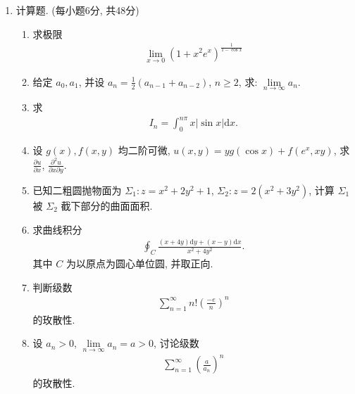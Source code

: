 \documentclass[space]{ctexart} %
\def\geq{\geqslant}
\begin{document}
\vspace*{0.5cm}
\begin{enumerate}[itemsep=1.2em,label=\arabic*.,topsep=0pt,left=0em]
\item 计算题. (每小题6分, 共48分)

\setcounter{enumii}{0}
\begin{enumerate}[itemsep=1.2em,label=(\arabic*),topsep=0pt,left=2em] %

\item  求极限
\begin{align*}
\lim\limits_{x \rightarrow 0}\left(1+x^{2} e^{x}\right)^{\frac{1}{1-\cos x}}
\end{align*}


\item   给定  $a_{0}, a_{1} $, 并设 $ a_{n}=\frac{1}{2}\left(a_{n-1}+a_{n-2}\right)$, $n \geq 2 $, 求:  $\lim\limits_{n \rightarrow \infty} a_{n} $.

\item 求
\begin{align*}
I_{n}=\int_{0}^{n \pi} x|\sin x| \mathrm{d} x.
\end{align*}

\item  设  $g(x), f(x, y)$  均二阶可微, $ u(x, y)=y g(\cos x)+f\left(e^{x}, x y\right) $, 求 $ \frac{\partial u}{\partial x}$, $\frac{\partial^{2} u}{\partial x \partial y} $.

\item 已知二粗圆抛物面为 $ \Sigma_{1}: z=x^{2}+2 y^{2}+1$, $\Sigma_{2}: z=2\left(x^{2}+3 y^{2}\right) $, 计算 $ \Sigma_{1} $ 被  $\Sigma_{2} $ 截下部分的曲面面积.

\item  求曲线积分
\begin{align*}
\oint_{C} \frac{(x+4 y) \mathrm{d} y+(x-y) \mathrm{d} x}{x^{2}+4 y^{2}} .
\end{align*}
其中 $ C $ 为以原点为圆心单位圆, 并取正向.

\item  判断级数
\begin{align*}
\sum_{n=1}^{\infty} n !\left(\frac{-e}{n}\right)^{n}
\end{align*}
的玫散性.

\item  设  $a_{n}>0$, $\lim\limits_{n \rightarrow \infty} a_{n}=a>0 $, 讨论级数
\begin{align*}
\sum_{n=1}^{\infty}\left(\frac{a}{a_{n}}\right)^{n}
\end{align*}
的玫散性.


\end{enumerate}
\end{enumerate}
\end{document}
